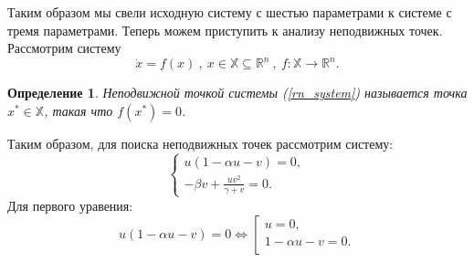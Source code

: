 \documentclass[10pt]{article}
\newtheorem{definition}{Определение}
\numberwithin{equation}{section}
\begin{document}
Таким образом мы свели исходную систему с шестью параметрами к системе с тремя параметрами. Теперь можем приступить к анализу неподвижных точек.
Рассмотрим систему
\begin{equation}\label{rn_system}
	\dot{x} = f(x) \ , \ x \in \mathbb{X} \subseteq \mathbb{R}^n \ , \ f : \mathbb{X} \to \mathbb{R}^n.
\end{equation}

\begin{definition}
	Неподвижной точкой системы (\ref{rn_system}) называется точка \( x^* \in \mathbb{X} \), такая что \( f(x^*) = 0 \).
\end{definition}

\noindent Таким образом, для поиска неподвижных точек рассмотрим систему:
\[ \begin{cases} 
	u(1 - \alpha u - v) = 0, \\ 
	-\beta v + \frac{uv^2}{\gamma + v} = 0 .
\end{cases} \]
Для первого уравения:
\[ u(1 - \alpha u - v) = 0 \iff \left[ \begin{array}{l} u = 0, \\ 1 - \alpha u - v = 0. \\ \end{array} \right. \]
\end{document}

